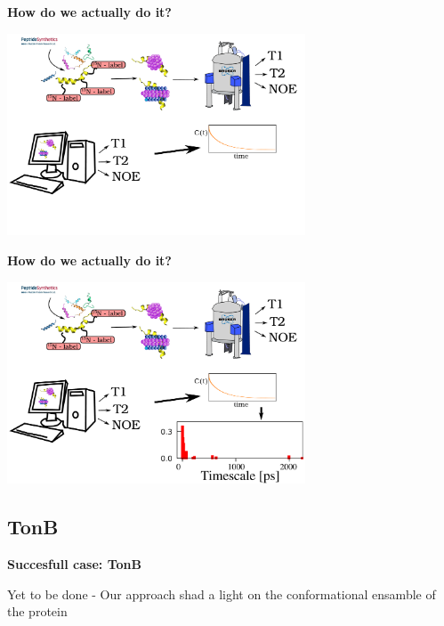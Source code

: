 \documentclass{beamer}
\begin{document}
\addtocounter{framenumber}{-1}
\begin{frame}
\begin{center}
\Large{\centering
\textbf{How do we actually do it?} \\}

\vspace{0.5cm}

\includegraphics[height=6cm]{what_we_do2.pdf}
\end{center}
\end{frame}


\addtocounter{framenumber}{-1}
\begin{frame}
\begin{center}
\Large{\centering
\textbf{How do we actually do it?} \\}

\vspace{0.5cm}

\includegraphics[height=6cm]{what_we_do1.pdf}
\end{center}
\end{frame}



\subsection{TonB}


\begin{frame}
\begin{center}
\Large{\centering
\textbf{Succesfull case: TonB} \\}

\vspace{0.5cm}

Yet to be done - Our approach shad a light on the conformational ensamble of the protein

\end{center}
\end{frame}
\end{document}
